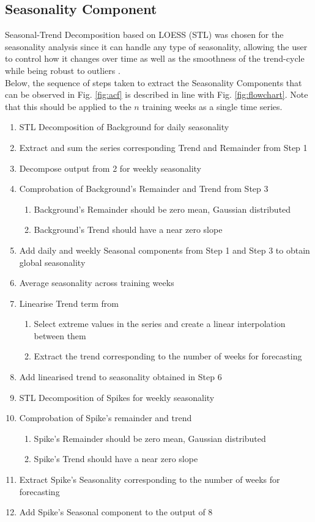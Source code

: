 \documentclass[conference, letterpaper]{IEEEtran}
\begin{document}
\subsection{Seasonality Component}
Seasonal-Trend Decomposition based on LOESS (STL) \cite{STL} was chosen for the seasonality analysis since it can handle any type of seasonality, allowing the user to control how it changes over time as well as the smoothness of the trend-cycle while being robust to outliers \cite{forecasting}.\\

Below, the sequence of steps taken to extract the Seasonality Components that can be observed in Fig. \ref{fig:acf} is described in line with Fig. \ref{fig:flowchart}. 
Note that this should be applied to the $n$ training weeks as a single time series.
\begin{enumerate}
	\item STL Decomposition of Background for daily seasonality
	\item Extract and sum the series corresponding Trend and Remainder from Step 1
	\item Decompose output from 2 for weekly seasonality
	\item Comprobation of Background's Remainder and Trend from Step 3
	\begin{enumerate}
		\item Background's Remainder should be zero mean, Gaussian distributed
		\item Background's Trend should have a near zero slope
	\end{enumerate}
	\item Add daily and weekly Seasonal components from Step 1 and Step 3 to obtain global seasonality
	\item Average seasonality across training weeks
	\item Linearise Trend term from
	\begin{enumerate}
		\item Select extreme values in the series and create a linear interpolation between them
		\item Extract the trend corresponding to the number of weeks for forecasting
	\end{enumerate}
	\item Add linearised trend to seasonality obtained in Step 6
	\item STL Decomposition of Spikes for weekly seasonality
	\item Comprobation of Spike's remainder and trend
	\begin{enumerate}
		\item Spike's Remainder should be zero mean, Gaussian distributed
		\item Spike's Trend should have a near zero slope
	\end{enumerate}
	\item Extract Spike's Seasonality corresponding to the number of weeks for forecasting
	\item Add Spike's Seasonal component to the output of 8
\end{enumerate}
\end{document}
